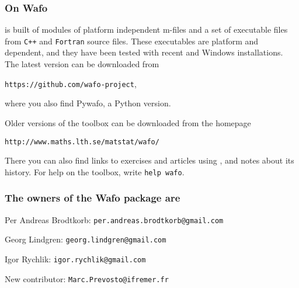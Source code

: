 \subsubsection*{On {\sc Wafo}}

\progname{} is built of modules of platform independent \ML{} m-files
and a set of executable files from \verb!C++! and \verb+Fortran+
source files. These executables are platform and  dependent,
and they have been tested with recent \ML{} and {\sc Windows} installations.
The latest version can be downloaded from

\verb+https://github.com/wafo-project+,

\noindent where you also find {\sc Pywafo}, a Python version. 


\smallskip
Older versions of the toolbox can be downloaded
from the \progname{} homepage

\noindent
\verb+http://www.maths.lth.se/matstat/wafo/+

\smallskip
\noindent
There you can also find links to exercises and articles using \progname{},
and notes about its history.
For help on the toolbox, write \verb+help wafo+. 


\subsubsection*{
The owners of the {\sc Wafo} package are}

\noindent Per Andreas Brodtkorb: \verb+per.andreas.brodtkorb@gmail.com+

\noindent Georg Lindgren: \verb+georg.lindgren@gmail.com+

\noindent Igor Rychlik: \verb+igor.rychlik@gmail.com+

\noindent New contributor: \verb+Marc.Prevosto@ifremer.fr+


